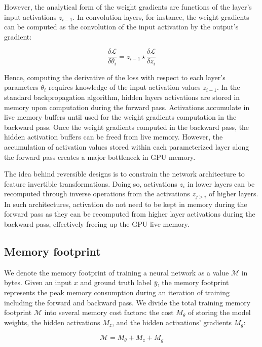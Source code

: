 \documentclass[twocolumn]{bmcart}
\begin{document}
However, the analytical form of the weight gradients are functions of the layer's input activations $z_{i-1}$.
In convolution layers, for instance, the weight gradients can be computed as the convolution of the input activation by the output's gradient:

 \begin{equation}
\frac{\delta \mathcal{L}}{\delta \theta_i} = z_{i-1} \star \frac{\delta \mathcal{L}}{\delta z_i}
 \end{equation}

Hence, computing the derivative of the loss with respect to each layer's parameters $\theta_i$ requires knowledge of the input activation values $z_{i-1}$.
In the standard backpropagation algorithm, hidden layers activations are stored in memory upon computation during the forward pass.
Activations accumulate in live memory buffers until used for the weight gradients computation in the backward pass.
Once the weight gradients computed in the backward pass, the hidden activation buffers can be freed from live memory.
However, the accumulation of activation values stored within each parameterized layer along the forward pass creates a major bottleneck in GPU memory.

The idea behind reversible designs is to constrain the network architecture to feature invertible transformations.
Doing so, activations $z_i$ in lower layers can be recomputed through inverse operations from the activations $z_{j>i}$ of higher layers.
In such architectures, activation do not need to be kept in memory during the forward pass as they can be recomputed from higher layer activations during the backward pass, effectively freeing up the GPU live memory.

\subsection{Memory footprint}

We denote the memory footprint of training a neural network as a value $\mathcal{M}$ in bytes.
Given an input $x$ and ground truth label $\bar{y}$, the memory footprint represents the peak memory consumption during an iteration of training including the forward and backward pass.
We divide the total training memory footprint $\mathcal{M}$ into several memory cost factors: the cost $M_{\theta}$ of storing the model weights, the hidden activations  $M_{z}$, and the hidden activations' gradients $M_{g}$:

\begin{equation}
\mathcal{M} = M_{\theta} + M_{z} + M_{g}
\end{equation}
\end{document}

